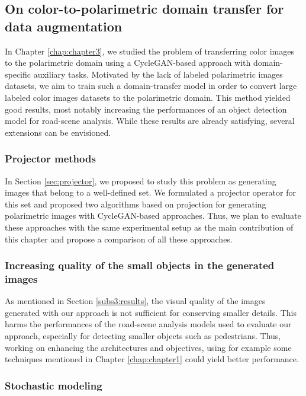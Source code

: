 \subsection*{On color-to-polarimetric domain transfer for data augmentation}

In Chapter \ref{chap:chapter3}, we studied the problem of transferring color images to the polarimetric domain using a CycleGAN-based approach with domain-specific auxiliary tasks. Motivated by the lack of labeled polarimetric images datasets, we aim to train such a domain-transfer model in order to convert large labeled color images datasets to the polarimetric domain.  This method yielded good results, most notably increasing the performances of an object detection model for road-scene analysis. While these results are already satisfying, several extensions can be envisioned.

\subsubsection*{Projector methods}

In Section \ref{sec:projector}, we proposed to study this problem as generating images that belong to a well-defined set. We formulated a projector operator for this set and proposed two algorithms based on projection for generating polarimetric images with CycleGAN-based approaches. Thus, we plan to evaluate these approaches with the same experimental setup as the main contribution of this chapter and propose a comparison of all these approaches.

\subsubsection*{Increasing quality of the small objects in the generated images}

As mentioned in Section \ref{subs3:results}, the visual quality of the images generated with our approach is not sufficient for conserving smaller details. This harms the performances of the road-scene analysis models used to evaluate our approach, especially for detecting smaller objects such as pedestrians. Thus, working on enhancing the architectures and objectives, using for example some techniques mentioned in Chapter \ref{chap:chapter1} could yield better performance.

\subsubsection*{Stochastic modeling}

